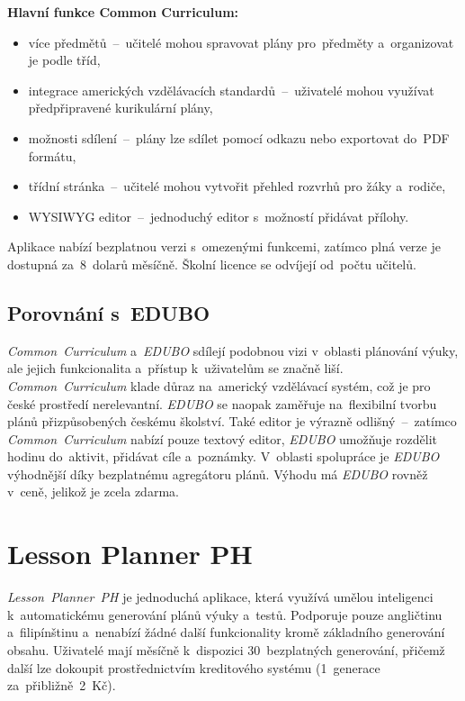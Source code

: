 \documentclass[male,czech,api_bc]{kitheses}
\begin{document}
\textbf{Hlavní funkce Common Curriculum:}
\begin{itemize}
	\item více předmětů~--~učitelé mohou spravovat plány pro~předměty a~organizovat je podle tříd,
	\item integrace amerických vzdělávacích standardů~--~uživatelé mohou využívat předpřipravené kurikulární plány,
	\item možnosti sdílení~--~plány lze sdílet pomocí odkazu nebo exportovat do~PDF formátu,
	\item třídní stránka~--~učitelé mohou vytvořit přehled rozvrhů pro žáky a~rodiče,
	\item WYSIWYG editor~--~jednoduchý editor s~možností přidávat přílohy.
\end{itemize}

Aplikace nabízí bezplatnou verzi s~omezenými funkcemi, zatímco plná verze je dostupná za~8~dolarů měsíčně. Školní licence se odvíjejí od~počtu učitelů.

\subsection{Porovnání s~EDUBO}  
\textit{Common~Curriculum} a~\textit{EDUBO} sdílejí podobnou vizi v~oblasti plánování výuky, ale jejich funkcionalita a~přístup k~uživatelům se značně liší. \textit{Common~Curriculum} klade důraz na~americký vzdělávací systém, což je pro české prostředí nerelevantní. \textit{EDUBO} se naopak zaměřuje na~flexibilní tvorbu plánů přizpůsobených českému školství. Také editor je výrazně odlišný~--~zatímco \textit{Common~Curriculum} nabízí pouze textový editor, \textit{EDUBO} umožňuje rozdělit hodinu do~aktivit, přidávat cíle a~poznámky. V~oblasti spolupráce je \textit{EDUBO} výhodnější díky bezplatnému agregátoru plánů. Výhodu má \textit{EDUBO} rovněž v~ceně, jelikož je zcela zdarma.

\section{Lesson Planner PH}

\textit{Lesson~Planner~PH} je jednoduchá aplikace, která využívá umělou inteligenci k~automatickému generování plánů výuky a~testů. Podporuje pouze angličtinu a~filipínštinu a~nenabízí žádné další funkcionality kromě základního generování obsahu. Uživatelé mají měsíčně k~dispozici 30~bezplatných generování, přičemž další lze dokoupit prostřednictvím kreditového systému (1~generace za~přibližně~2~Kč).
\end{document}
